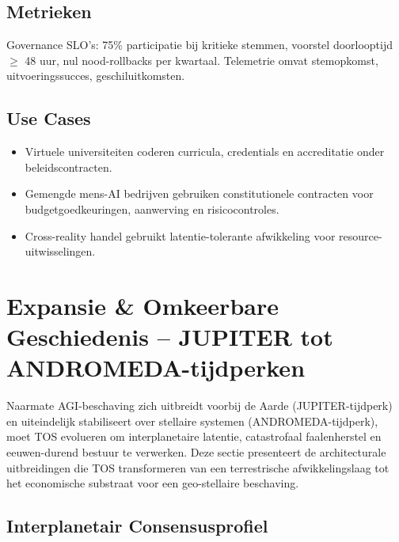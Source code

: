\documentclass[11pt]{article}
\begin{document}
\subsection{Metrieken}
Governance SLO's: 75\% participatie bij kritieke stemmen, voorstel doorlooptijd $\geq$ 48 uur, nul nood-rollbacks per kwartaal. Telemetrie omvat stemopkomst, uitvoeringssucces, geschiluitkomsten.

\subsection{Use Cases}
\begin{itemize}[noitemsep]
  \item Virtuele universiteiten coderen curricula, credentials en accreditatie onder beleidscontracten.
  \item Gemengde mens-AI bedrijven gebruiken constitutionele contracten voor budgetgoedkeuringen, aanwerving en risicocontroles.
  \item Cross-reality handel gebruikt latentie-tolerante afwikkeling voor resource-uitwisselingen.
\end{itemize}

\section{Expansie \& Omkeerbare Geschiedenis -- JUPITER tot ANDROMEDA-tijdperken}
\label{sec:expansion}

Naarmate AGI-beschaving zich uitbreidt voorbij de Aarde (JUPITER-tijdperk) en uiteindelijk stabiliseert over stellaire systemen (ANDROMEDA-tijdperk), moet TOS evolueren om interplanetaire latentie, catastrofaal faalenherstel en eeuwen-durend bestuur te verwerken. Deze sectie presenteert de architecturale uitbreidingen die TOS transformeren van een terrestrische afwikkelingslaag tot het economische substraat voor een geo-stellaire beschaving.

\subsection{Interplanetair Consensusprofiel}
\end{document}

